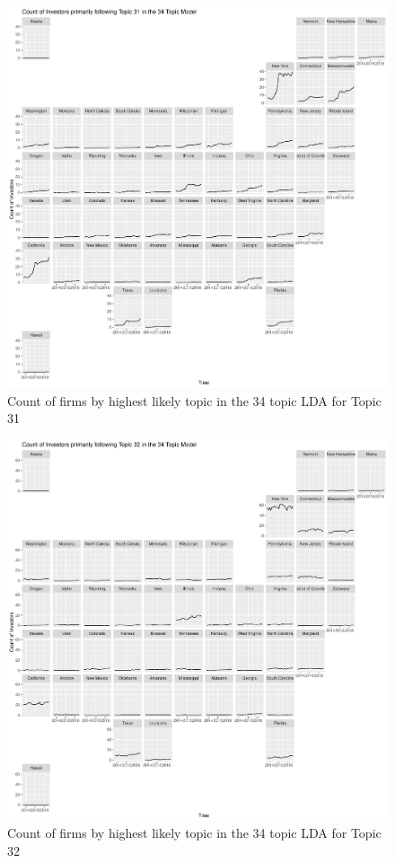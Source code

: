 \begin{figure}
	\centering
	\includegraphics[width=1\linewidth]{Figures/ChapterV/USA_34_Topic31.pdf}
	\caption[Count of firm for Topic 31 by quarter]{Count of firms by highest likely topic in the 34 topic LDA for Topic 31}
	\label{fig:StateLDA31}
\end{figure}

\begin{figure}
	\centering
	\includegraphics[width=1\linewidth]{Figures/ChapterV/USA_34_Topic32.pdf}
	\caption[Count of firm for Topic 32 by quarter]{Count of firms by highest likely topic in the 34 topic LDA for Topic 32}
	\label{fig:StateLDA32}
\end{figure}

